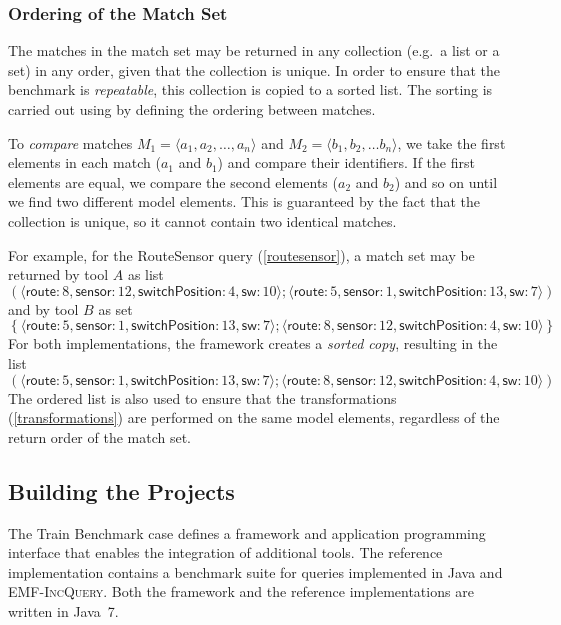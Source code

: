 \documentclass[submission,copyright,creativecommons]{eptcs}
\newcommand{\eiq}{\textsc{EMF-IncQuery}}
\begin{document}
\subsubsection{Ordering of the Match Set}
\label{ordering}

The matches in the match set may be returned in any collection (e.g.\ a list or a set) in any order, given that the collection is unique. In order to ensure that the benchmark is \emph{repeatable}, this collection is copied to a sorted list. The sorting is carried out using by defining the ordering between matches.

To \emph{compare} matches $M_1 = \langle a_1, a_2, \ldots, a_n \rangle$ and $M_2 = \langle b_1, b_2, \ldots b_n \rangle$, we take the first elements in each match ($a_1$ and $b_1$) and compare their identifiers. If the first elements are equal, we compare the second elements ($a_2$ and $b_2$) and so on until we find two different model elements. This is guaranteed by the fact that the collection is unique, so it cannot contain two identical matches.

For example, for the \textsf{RouteSensor} query (\autoref{routesensor}), a match set may be returned by tool $A$ as list
\[\left(
\langle\textsf{route}: 8, \textsf{sensor}: 12, \textsf{switchPosition}: 4, \textsf{sw}: 10\rangle;
\langle\textsf{route}: 5, \textsf{sensor}: 1, \textsf{switchPosition}: 13, \textsf{sw}: 7\rangle
\right)\]
and by tool $B$ as set
\[\left\{
\langle\textsf{route}: 5, \textsf{sensor}: 1, \textsf{switchPosition}: 13, \textsf{sw}: 7\rangle;
\langle\textsf{route}: 8, \textsf{sensor}: 12, \textsf{switchPosition}: 4, \textsf{sw}: 10\rangle
\right\}\]
For both implementations, the framework creates a \emph{sorted copy}, resulting in the list
\[\left(
\langle\textsf{route}: 5, \textsf{sensor}: 1, \textsf{switchPosition}: 13, \textsf{sw}: 7\rangle;
\langle\textsf{route}: 8, \textsf{sensor}: 12, \textsf{switchPosition}: 4, \textsf{sw}: 10\rangle
\right)\]
The ordered list is also used to ensure that the transformations (\autoref{transformations}) are performed on the same model elements, regardless of the return order of the match set.

\subsection{Building the Projects}

The Train Benchmark case defines a framework and application programming interface that enables the integration of additional tools. The reference implementation contains a benchmark suite for queries implemented in Java and \eiq{}. Both the framework and the reference implementations are written in Java~7.
\end{document}
